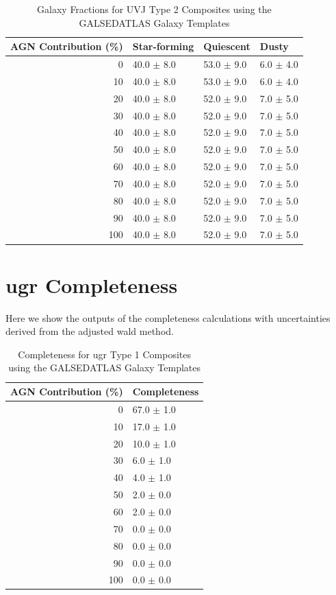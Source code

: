 \begin{appendices}
\begin{table}[h]
\centering
\begin{tabular}{rlll}
\hline
AGN Contribution (\%) & Star-forming & Quiescent & Dusty \\
\hline
0 & 40.0 $\pm$ 8.0 & 53.0 $\pm$ 9.0 & 6.0 $\pm$ 4.0 \\
10 & 40.0 $\pm$ 8.0 & 53.0 $\pm$ 9.0 & 6.0 $\pm$ 4.0 \\
20 & 40.0 $\pm$ 8.0 & 52.0 $\pm$ 9.0 & 7.0 $\pm$ 5.0 \\
30 & 40.0 $\pm$ 8.0 & 52.0 $\pm$ 9.0 & 7.0 $\pm$ 5.0 \\
40 & 40.0 $\pm$ 8.0 & 52.0 $\pm$ 9.0 & 7.0 $\pm$ 5.0 \\
50 & 40.0 $\pm$ 8.0 & 52.0 $\pm$ 9.0 & 7.0 $\pm$ 5.0 \\
60 & 40.0 $\pm$ 8.0 & 52.0 $\pm$ 9.0 & 7.0 $\pm$ 5.0 \\
70 & 40.0 $\pm$ 8.0 & 52.0 $\pm$ 9.0 & 7.0 $\pm$ 5.0 \\
80 & 40.0 $\pm$ 8.0 & 52.0 $\pm$ 9.0 & 7.0 $\pm$ 5.0 \\
90 & 40.0 $\pm$ 8.0 & 52.0 $\pm$ 9.0 & 7.0 $\pm$ 5.0 \\
100 & 40.0 $\pm$ 8.0 & 52.0 $\pm$ 9.0 & 7.0 $\pm$ 5.0 \\
\hline
\end{tabular}
\caption{Galaxy Fractions for UVJ Type 2 Composites using the GALSEDATLAS Galaxy Templates}
\end{table}

\newpage
\section{ugr Completeness}
Here we show the outputs of the completeness calculations with uncertainties derived from the adjusted wald method.

\begin{table}[h]
\centering
\begin{tabular}{rl}
\hline
AGN Contribution (\%) & Completeness \\
\hline
0 & 67.0 $\pm$ 1.0 \\
10 & 17.0 $\pm$ 1.0 \\
20 & 10.0 $\pm$ 1.0 \\
30 & 6.0 $\pm$ 1.0 \\
40 & 4.0 $\pm$ 1.0 \\
50 & 2.0 $\pm$ 0.0 \\
60 & 2.0 $\pm$ 0.0 \\
70 & 0.0 $\pm$ 0.0 \\
80 & 0.0 $\pm$ 0.0 \\
90 & 0.0 $\pm$ 0.0 \\
100 & 0.0 $\pm$ 0.0 \\
\hline
\end{tabular}
\caption{Completeness for ugr Type 1 Composites using the GALSEDATLAS Galaxy Templates}
\end{table}


\end{appendices}
